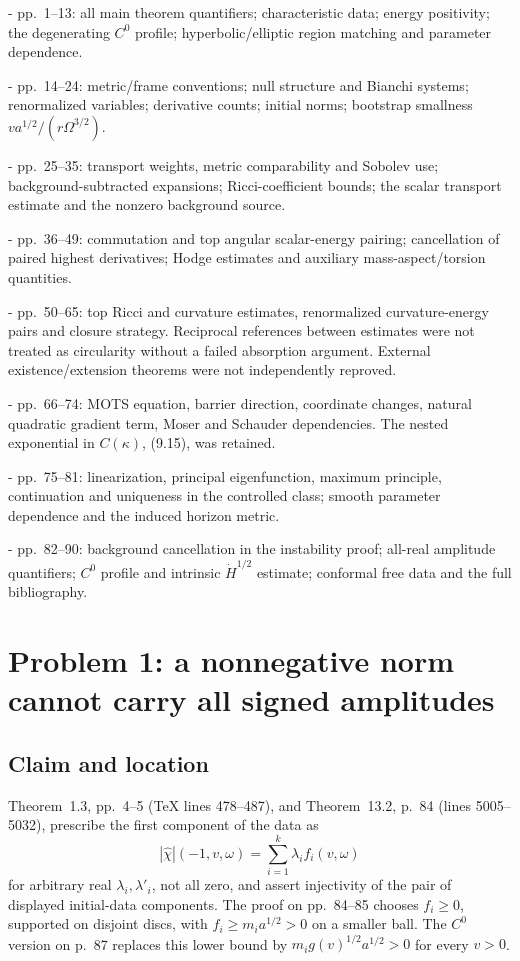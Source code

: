\documentclass[10pt]{article}
\begin{document}
- pp. 1–13: all main theorem quantifiers; characteristic data; energy positivity; the degenerating \(C^0\) profile; hyperbolic/elliptic region matching and parameter dependence.\par
- pp. 14–24: metric/frame conventions; null structure and Bianchi systems; renormalized variables; derivative counts; initial norms; bootstrap smallness \(v a^{1/2}/(r\Omega^{3/2})\).\par
- pp. 25–35: transport weights, metric comparability and Sobolev use; background-subtracted expansions; Ricci-coefficient bounds; the scalar transport estimate and the nonzero background source.\par
- pp. 36–49: commutation and top angular scalar-energy pairing; cancellation of paired highest derivatives; Hodge estimates and auxiliary mass-aspect/torsion quantities.\par
- pp. 50–65: top Ricci and curvature estimates, renormalized curvature-energy pairs and closure strategy. Reciprocal references between estimates were not treated as circularity without a failed absorption argument. External existence/extension theorems were not independently reproved.\par
- pp. 66–74: MOTS equation, barrier direction, coordinate changes, natural quadratic gradient term, Moser and Schauder dependencies. The nested exponential in \(C(\kappa)\), (9.15), was retained.\par
- pp. 75–81: linearization, principal eigenfunction, maximum principle, continuation and uniqueness in the controlled class; smooth parameter dependence and the induced horizon metric.\par
- pp. 82–90: background cancellation in the instability proof; all-real amplitude quantifiers; \(C^0\) profile and intrinsic \(\dot H^{1/2}\) estimate; conformal free data and the full bibliography.\par
\section*{Problem 1: a nonnegative norm cannot carry all signed amplitudes}
\subsection*{Claim and location}
Theorem 1.3, pp. 4–5 (TeX lines 478–487), and Theorem 13.2, p. 84 (lines 5005–5032), prescribe the first component of the data as \[|\widehat\chi|(-1,v,\omega)=\sum_{i=1}^k\lambda_i f_i(v,\omega)\] for arbitrary real \(\lambda_i,\lambda'_i\), not all zero, and assert injectivity of the pair of displayed initial-data components. The proof on pp. 84–85 chooses \(f_i\ge0\), supported on disjoint discs, with \(f_i\ge m_i a^{1/2}>0\) on a smaller ball. The \(C^0\) version on p. 87 replaces this lower bound by \(m_i g(v)^{1/2}a^{1/2}>0\) for every \(v>0\).\par
\end{document}
